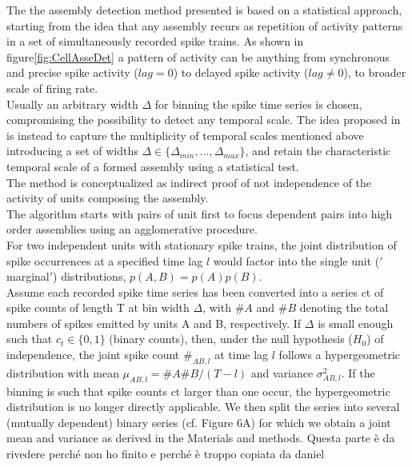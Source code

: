The the assembly detection method presented is based on a statistical approach, starting from the idea that any assembly recurs as repetition of activity patterns in a set of simultaneously recorded spike trains. As shown in figure\ref{fig:CellAsseDet} a pattern of activity can be anything from synchronous and precise spike activity ($lag = 0$) to delayed spike activity ($lag\neq 0$), to broader scale of firing rate.\\Usually an arbitrary width $\Delta$ for binning the spike time series is chosen, compromising the possibility to detect any temporal scale. The idea proposed in \cite{RussoDurstewitz} is instead to capture the multiplicity of temporal scales mentioned above introducing a set of widths $\Delta \in \{\Delta_{min},...,\Delta_{max}\}$, and retain the characteristic temporal scale of a formed assembly using a statistical test.\\The method is conceptualized as indirect proof of not independence of the activity of units composing the assembly.\\The algorithm starts with pairs of unit first to focus dependent pairs into high order assemblies using an agglomerative procedure.\\For two independent units with stationary spike trains, the joint distribution of spike occurrences at a specified time lag $l$ would factor into the single unit ($'$marginal$'$) distributions, $p(A,B)=p(A)p(B)$.\\ Assume each recorded spike time series has been converted into a series {ct} of spike counts of length T at bin width $\Delta$, with $\# A$ and $\# B$ denoting the total numbers of spikes emitted by units A and B, respectively. If $\Delta$ is small enough such that $c_t\in\{0,1\}$ (binary counts), then, under the null hypothesis ($H_0$) of independence, the joint spike count $\#_{AB,l}$ at time lag $l$ follows a hypergeometric distribution with mean $\mu_{AB,l}=\# A \# B/(T-l)$ and variance $\sigma^{2}_{AB,l}$. If the binning is such that spike counts ct larger than one occur, the hypergeometric distribution is no longer directly applicable. We then split the series into several (mutually dependent) binary series (cf. Figure 6A) for which we obtain a joint mean and variance as derived in the Materials and methods.
{\color{red} Questa parte è da rivedere perché  non ho  finito e perché è troppo copiata da daniel }
